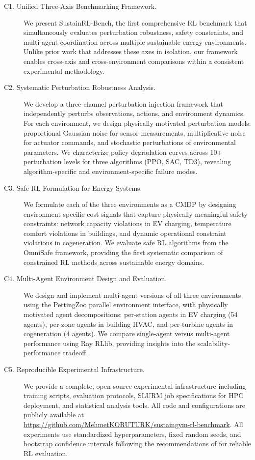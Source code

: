 \begin{description}
    \item[C1. Unified Three-Axis Benchmarking Framework.] We present SustainRL-Bench, the first comprehensive RL benchmark that simultaneously evaluates perturbation robustness, safety constraints, and multi-agent coordination across multiple sustainable energy environments. Unlike prior work that addresses these axes in isolation, our framework enables cross-axis and cross-environment comparisons within a consistent experimental methodology.

    \item[C2. Systematic Perturbation Robustness Analysis.] We develop a three-channel perturbation injection framework that independently perturbs observations, actions, and environment dynamics. For each environment, we design physically motivated perturbation models: proportional Gaussian noise for sensor measurements, multiplicative noise for actuator commands, and stochastic perturbations of environmental parameters. We characterize policy degradation curves across 10+ perturbation levels for three algorithms (PPO, SAC, TD3), revealing algorithm-specific and environment-specific failure modes.

    \item[C3. Safe RL Formulation for Energy Systems.] We formulate each of the three environments as a CMDP by designing environment-specific cost signals that capture physically meaningful safety constraints: network capacity violations in EV charging, temperature comfort violations in buildings, and dynamic operational constraint violations in cogeneration. We evaluate safe RL algorithms from the OmniSafe framework, providing the first systematic comparison of constrained RL methods across sustainable energy domains.

    \item[C4. Multi-Agent Environment Design and Evaluation.] We design and implement multi-agent versions of all three environments using the PettingZoo parallel environment interface, with physically motivated agent decompositions: per-station agents in EV charging (54 agents), per-zone agents in building HVAC, and per-turbine agents in cogeneration (4 agents). We compare single-agent versus multi-agent performance using Ray RLlib, providing insights into the scalability-performance tradeoff.

    \item[C5. Reproducible Experimental Infrastructure.] We provide a complete, open-source experimental infrastructure including training scripts, evaluation protocols, SLURM job specifications for HPC deployment, and statistical analysis tools. All code and configurations are publicly available at \url{https://github.com/MehmetKORUTURK/sustaingym-rl-benchmark}. All experiments use standardized hyperparameters, fixed random seeds, and bootstrap confidence intervals following the recommendations of \citet{agarwal2021deep} for reliable RL evaluation.
\end{description}


